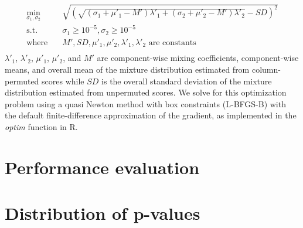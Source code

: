 \documentclass{article}
\begin{document}
\begin{equation} \label{eq:3}
\begin{aligned}
    \min_{\sigma_1, \sigma_2} \quad & \sqrt{\left(\sqrt{(\sigma_1 + \mu'_1 - M')\lambda'_1 + (\sigma_2 + \mu'_2 - M')\lambda'_2} - SD\right)^2}\\
    \textrm{s.t.}  \quad & \sigma_1 \geq 10^{-5}, \sigma_2 \geq 10^{-5}    \\
    \textrm{where} \quad & M', SD, \mu'_1, \mu'_2, \lambda'_1, \lambda'_2 \text{ are constants} \\
\end{aligned}
\end{equation}
$\lambda'_1$, $\lambda'_2$, $\mu'_1$, $\mu'_2$, and $M'$ are component-wise mixing coefficients, component-wise means, and overall mean of the mixture distribution estimated from column-permuted scores while $SD$ is the overall standard deviation of the mixture distribution estimated from unpermuted scores. We solve for this optimization problem using a quasi Newton method with box constraints (L-BFGS-B) with the default finite-difference approximation of the gradient, as implemented in the \emph{optim} function in R.   

\section{Performance evaluation} 

\section{Distribution of p-values}

\newpage
{}

\end{document}
